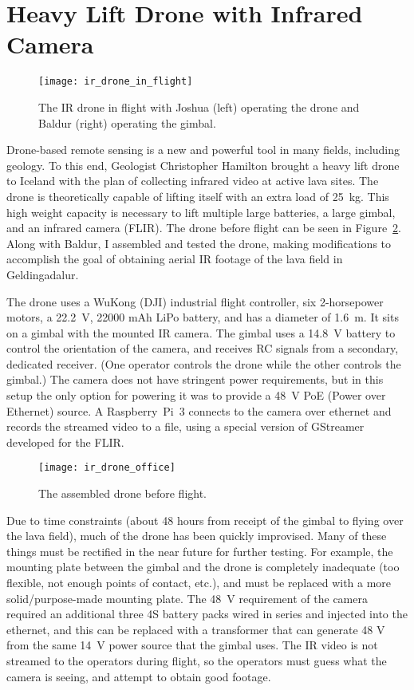 \section{Heavy Lift Drone with Infrared Camera}
\label{section:ir_drone}

\begin{figure}
    \centering
    \texttt{[image: ir\_drone\_in\_flight]}
    \caption{The IR drone in flight with Joshua (left) operating the drone and Baldur (right) operating the gimbal.}
    \label{figure:ir_drone_in_flight}
\end{figure}

Drone-based remote sensing is a new and powerful tool in many fields, including geology.
To this end, Geologist Christopher Hamilton brought a heavy lift drone to Iceland
with the plan of collecting infrared video at active lava sites.
The drone is theoretically capable of lifting itself with an extra load of 25~kg.
This high weight capacity is necessary to lift multiple large batteries,
a large gimbal,
and an infrared camera (FLIR).
The drone before flight can be seen in Figure~\ref{figure:ir_drone_office}.
Along with Baldur, I assembled and tested the drone, making modifications to accomplish the goal of obtaining
aerial IR footage of the lava field in Geldingadalur.

The drone uses a WuKong (DJI) industrial flight controller,
six 2-horsepower motors,
a 22.2~V, 22000 mAh LiPo battery,
and has a diameter of 1.6~m.
It sits on a gimbal with the mounted IR camera.
The gimbal uses a 14.8~V battery to control the orientation of the camera,
and receives RC signals from a secondary, dedicated receiver.
(One operator controls the drone while the other controls the gimbal.)
The camera does not have stringent power requirements,
but in this setup the only option for powering it was to provide
a 48~V PoE (Power over Ethernet) source.
A Raspberry~Pi~3 connects to the camera over ethernet and records the streamed
video to a file, using a special version of GStreamer developed for the FLIR.

\begin{figure}
    \centering
    \texttt{[image: ir\_drone\_office]}
    \caption{The assembled drone before flight.}
    \label{figure:ir_drone_office}
\end{figure}

Due to time constraints (about 48 hours from receipt of the gimbal
to flying over the lava field),
much of the drone has been quickly improvised.
Many of these things must be rectified in the near future for further testing.
For example, the mounting plate between the gimbal and the drone
is completely inadequate (too flexible, not enough points of contact, etc.),
and must be replaced with a more solid/purpose-made mounting plate.
The 48~V requirement of the camera required an additional three 4S battery packs
wired in series and injected into the ethernet,
and this can be replaced with a transformer that can generate 48 V
from the same 14~V power source that the gimbal uses.
The IR video is not streamed to the operators during flight,
so the operators must guess what the camera is seeing, and attempt to obtain good footage.


